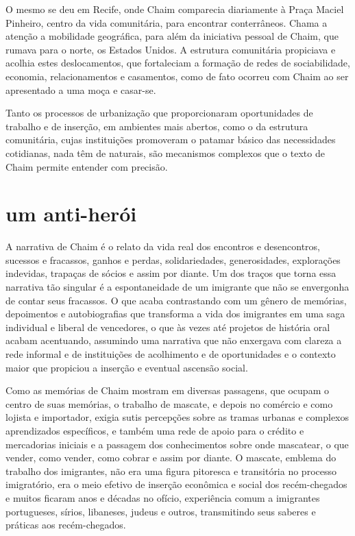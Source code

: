 O mesmo se deu em Recife,
onde Chaim comparecia diariamente à Praça Maciel Pinheiro, centro da
vida comunitária, para encontrar conterrâneos. Chama a atenção a
mobilidade geográfica, para além da iniciativa pessoal de Chaim, que
rumava para o norte, os Estados Unidos. A estrutura comunitária
propiciava e acolhia estes deslocamentos, que fortaleciam a formação de
redes de sociabilidade, economia, relacionamentos e casamentos, como de
fato ocorreu com Chaim ao ser apresentado a uma moça e casar-se.

Tanto os processos de urbanização que proporcionaram oportunidades de
trabalho e de inserção, em ambientes mais abertos, como o da estrutura
comunitária, cujas instituições promoveram o patamar básico das
necessidades cotidianas, nada têm de naturais, são mecanismos complexos
que o texto de Chaim permite entender com precisão.

\section{um anti-herói}

A narrativa de Chaim é o relato da vida real dos encontros e
desencontros, sucessos e fracassos, ganhos e perdas, solidariedades,
generosidades, explorações indevidas, trapaças de sócios e assim por
diante. Um dos traços que torna essa narrativa tão singular é a
espontaneidade de um imigrante que não se envergonha de contar seus
fracassos. O que acaba contrastando com um gênero de memórias,
depoimentos e autobiografias que transforma a vida dos imigrantes em uma
saga individual e liberal de vencedores, o que às vezes até projetos de
história oral acabam acentuando, assumindo uma narrativa que não
enxergava com clareza a rede informal e de instituições de acolhimento e
de oportunidades e o contexto maior que propiciou a inserção e eventual
ascensão social.

Como as memórias de Chaim mostram em diversas passagens, que ocupam o
centro de suas memórias, o trabalho de mascate, e depois no comércio e
como lojista e importador, exigia sutis percepções sobre as tramas
urbanas e complexos aprendizados específicos, e também uma rede de apoio
para o crédito e mercadorias iniciais e a passagem dos conhecimentos
sobre onde mascatear, o que vender, como vender, como cobrar e assim por
diante. O mascate, emblema do trabalho dos imigrantes, não era uma
figura pitoresca e transitória no processo imigratório, era o meio
efetivo de inserção econômica e social dos recém-chegados e muitos
ficaram anos e décadas no ofício, experiência comum a imigrantes
portugueses, sírios, libaneses, judeus e outros, transmitindo seus
saberes e práticas aos recém-chegados.

